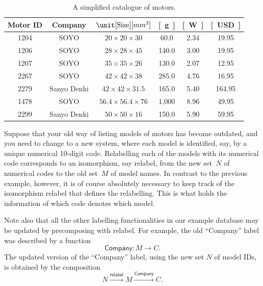 {\begin{example}[Relabelling]
    \begin{table}[h]
        \centering
        \begin{tabular}{c|c|c|c|c|c}
            Motor ID      & Company              & $\unit[\text{Size}]{[mm^3]}$  & \unit[Weight]{[g]} & \unit[Max Power]{[W]}
                          & \unit[Cost]{[USD]} \\
            \hline
            \textsf{1204} & \textsf{SOYO}        & $20 \times 20 \times 30$      & 60.0               & 2.34                  & 19.95 \\
            \textsf{1206} & \textsf{SOYO}        & $28 \times 28 \times 45$      & 140.0              & 3.00                  & 19.95 \\
            \textsf{1207} & \textsf{SOYO}        & $35 \times 35\times 26$       & 130.0              & 2.07                  & 12.95 \\
            \textsf{2267} & \textsf{SOYO}        & $42 \times 42 \times38$       & 285.0              & 4.76                  & 16.95 \\
            \textsf{2279} & \textsf{Sanyo Denki} & $42 \times 42 \times 31.5$    & 165.0              & 5.40                  & 164.95 \\
            \textsf{1478} & \textsf{SOYO}        & $56.4 \times 56.4 \times 76 $ & 1,000              & 8.96                  & 49.95 \\
            \textsf{2299} & \textsf{Sanyo Denki} & $50 \times 50 \times 16$      & 150.0              & 5.90                  & 59.95
        \end{tabular}

        \caption{
            A simplified catalogue of motors.
        }
        \label{tab:electric_motors}
    \end{table}
    Suppose that your old way of listing models of motors has become outdated, and you need to change to a new system, where each model is identified, say, by a unique numerical 10-digit code.
    Relabelling each of the models with its numerical code corresponds to an isomorphism, say \textsf{relabel}, from the new set~$N$ of numerical codes to the old set~$M$ of model names.
    In contrast to the previous example, however, it is of course absolutely necessary to keep track of the isomorphism \textsf{relabel} that defines the relabelling.
    This is what holds the information of which code denotes which model.

    Note also that all the other labelling functionalities in our example database may be updated by precomposing with \textsf{relabel}.
    For example, the old ``Company'' label was described by a function
    \begin{equation}
        \textsf{Company}\colon M \to C.
    \end{equation}
    The updated version of the ``Company'' label, using the new set $N$ of model IDs, is obtained by the composition
    \begin{equation}
        N \overset{\textsf{relabel}}{\longrightarrow} M \overset{\textsf{Company}}{\longrightarrow} C.
    \end{equation}
\end{example}

}
